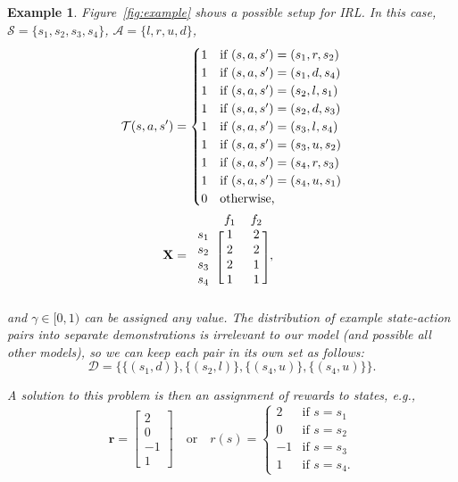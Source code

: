 \documentclass{mpaper}
\newtheorem{example}[theorem]{Example}
\begin{document}
\begin{example}
  Figure~\ref{fig:example} shows a possible setup for IRL. In this case,
  $\mathcal{S} = \{ s_1, s_2, s_3, s_4 \}$, $\mathcal{A} = \{ l, r, u, d \}$,
  \begin{align*}
    \mathcal{T}(s, a, s') &= \begin{cases}
      1 & \text{if } (s, a, s') = (s_1, r, s_2) \\
      1 & \text{if } (s, a, s') = (s_1, d, s_4) \\
      1 & \text{if } (s, a, s') = (s_2, l, s_1) \\
      1 & \text{if } (s, a, s') = (s_2, d, s_3) \\
      1 & \text{if } (s, a, s') = (s_3, l, s_4) \\
      1 & \text{if } (s, a, s') = (s_3, u, s_2) \\
      1 & \text{if } (s, a, s') = (s_4, r, s_3) \\
      1 & \text{if } (s, a, s') = (s_4, u, s_1) \\
      0 & \text{otherwise,}
    \end{cases} \\
      \mathbf{X} &= \begin{blockarray}{ccc}
        & f_1 & f_2 \\
        \begin{block}{c[cc]}
          s_1 & 1 & 2 \\
          s_2 & 2 & 2 \\
          s_3 & 2 & 1 \\
          s_4 & 1 & 1 \\
        \end{block}
      \end{blockarray},
  \end{align*}
  and $\gamma \in [0, 1)$ can be assigned any value. The distribution of example
  state-action pairs into separate demonstrations is irrelevant to our model
  (and possible all other models), so we can keep each pair in its own set as
  follows:
  \[
    \mathcal{D} = \{ \{(s_1, d)\}, \{(s_2, l)\}, \{(s_4, u)\}, \{(s_4, u)\} \}.
  \]

  A solution to this problem is then an assignment of rewards to states, e.g.,
  \[
    \mathbf{r} = \begin{bmatrix}
      2 \\
      0 \\
      -1 \\
      1
    \end{bmatrix} \quad \text{or} \quad r(s) = \begin{cases}
      2 & \text{if } s = s_1 \\
      0 & \text{if } s = s_2 \\
      -1 & \text{if } s = s_3 \\
      1 & \text{if } s = s_4.
    \end{cases}
  \]
\end{example}
\end{document}
